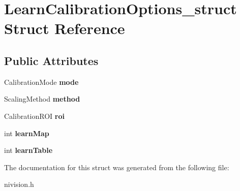 \hypertarget{structLearnCalibrationOptions__struct}{
\section{LearnCalibrationOptions\_\-struct Struct Reference}
\label{structLearnCalibrationOptions__struct}
}
\subsection*{Public Attributes}
\begin{DoxyCompactItemize}
\item 
\hypertarget{structLearnCalibrationOptions__struct_a5bb08c9b69f8ef6770ac905460c848c8}{
CalibrationMode {\bfseries mode}}
\label{structLearnCalibrationOptions__struct_a5bb08c9b69f8ef6770ac905460c848c8}

\item 
\hypertarget{structLearnCalibrationOptions__struct_a6cdc735b984faf48c3c0517930bd73ac}{
ScalingMethod {\bfseries method}}
\label{structLearnCalibrationOptions__struct_a6cdc735b984faf48c3c0517930bd73ac}

\item 
\hypertarget{structLearnCalibrationOptions__struct_af6a356b33bfa2134b863d9063299835e}{
CalibrationROI {\bfseries roi}}
\label{structLearnCalibrationOptions__struct_af6a356b33bfa2134b863d9063299835e}

\item 
\hypertarget{structLearnCalibrationOptions__struct_af6c3a5fed15a1a0abc4cad5987cda3fa}{
int {\bfseries learnMap}}
\label{structLearnCalibrationOptions__struct_af6c3a5fed15a1a0abc4cad5987cda3fa}

\item 
\hypertarget{structLearnCalibrationOptions__struct_a6ae03a56adc36f78670063049fa2fd6e}{
int {\bfseries learnTable}}
\label{structLearnCalibrationOptions__struct_a6ae03a56adc36f78670063049fa2fd6e}

\end{DoxyCompactItemize}


The documentation for this struct was generated from the following file:\begin{DoxyCompactItemize}
\item 
nivision.h\end{DoxyCompactItemize}
